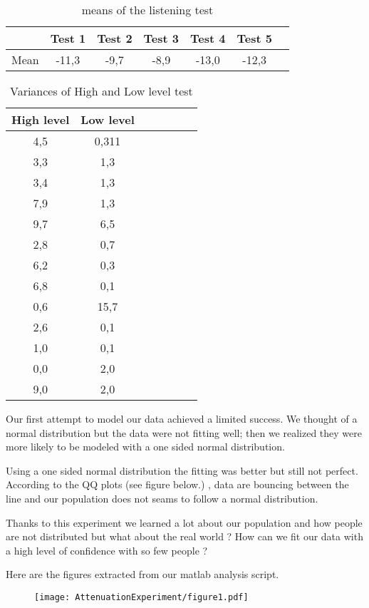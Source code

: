 \begin{table}[H]
\centering
\begin{tabular}{*{7}{c}}
  \hline
   & Test 1 & Test 2 & Test 3  & Test 4  & Test 5  
  \\
  \hline
  Mean & -11,3 & -9,7 & -8,9	 & -13,0 & -12,3 \\
  \hline
\end{tabular}
  \caption{means of the listening test}
	\label{tab:MeanListeningResults}
\end{table}

\begin{table}[H]
\centering
\begin{tabular}{*{7}{c}}
  \hline
   High level  & Low level 
  \\
  \hline
  4,5	& 0,311 \\
  3,3	& 1,3 \\
  3,4	& 1,3 \\
  7,9	& 1,3 \\
  9,7	& 6,5 \\
  2,8	& 0,7 \\
  6,2	& 0,3 \\
  6,8	& 0,1 \\
  0,6	& 15,7 \\
  2,6	& 0,1 \\
  1,0	& 0,1 \\
  0,0	& 2,0 \\
  9,0	& 2,0 \\
  \hline
\end{tabular}
  \caption{Variances of High and Low level test}
	\label{tab:VarListeningResults}
\end{table}

Our first attempt to model our data achieved a limited success. We thought of a normal distribution but the data were not fitting well; then we realized they were more likely to be modeled with a one sided normal distribution.

Using a one sided normal distribution the fitting was better but still not perfect. According to the QQ plots (see figure below.) , data are bouncing between the line and our population does not seams to follow a normal distribution. 


Thanks to this experiment we learned a lot about our population and how people are not distributed but what about the real world ? How can we fit our data with a high level of confidence with so few people ?

Here are the figures extracted from our matlab analysis script.

\begin{figure}[H]
	\texttt{[image: AttenuationExperiment/figure1.pdf]}
\end{figure}


